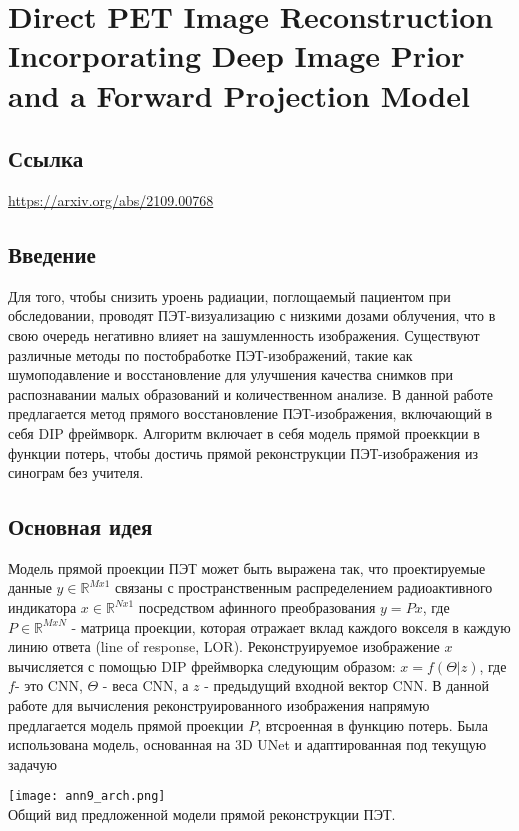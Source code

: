 \section{Direct PET Image Reconstruction Incorporating Deep Image Prior and a Forward Projection Model}
\subsection*{Ссылка} \url{https://arxiv.org/abs/2109.00768}
\subsection*{Введение}
Для того, чтобы снизить уроень радиации, поглощаемый пациентом при обследовании, 
проводят ПЭТ-визуализацию с низкими дозами облучения, что в свою очередь негативно влияет на 
зашумленность изображения. Существуют различные методы по постобработке ПЭТ-изображений,
такие как шумоподавление и восстановление для улучшения качества снимков при распознавании 
малых образований и количественном анализе. В данной работе предлагается метод
прямого восстановление ПЭТ-изображения, включающий в себя DIP фреймворк.
Алгоритм включает в себя модель прямой проеккции в функции потерь, чтобы достичь 
прямой реконструкции ПЭТ-изображения из синограм без учителя. 
\subsection*{Основная идея}
Модель прямой проекции ПЭТ может быть выражена так, что проектируемые данные \(y\in\mathbb{R}^{Mx1}\) связаны 
с пространственным распределением радиоактивного индикатора \(x\in\mathbb{R}^{Nx1}\) посредством афинного 
преобразования \(y=Px\), где \(P\in\mathbb{R}^{MxN}\) - матрица проекции, которая 
отражает вклад каждого вокселя в каждую линию ответа (line of response, LOR).
Реконструируемое изображение \(x\) вычисляется с помощью DIP фреймворка
следующим образом: \(x=f(\Theta|z)\), где \(f\)- это CNN, \(\Theta\) - веса CNN, а 
\(z\) - предыдущий входной вектор CNN. В данной работе для вычисления реконструированного 
изображения напрямую предлагается модель прямой проекции \(P\), втсроенная в функцию потерь. Была 
использована модель, основанная на 3D UNet и адаптированная под текущую задачую

\begin{minipage}{1.0\linewidth}
    \begin{center}
        \texttt{[image: ann9\_arch.png]} \\
        \caption{\scriptsize{Общий вид предложенной модели прямой реконструкции ПЭТ.}}
    \end{center}
    
\end{minipage}


